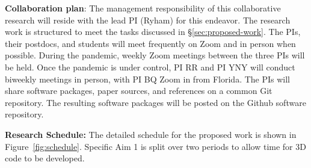 \medskip

\textbf{Collaboration plan}: 
%
The management responsibility of this collaborative research will reside
with the lead PI (Ryham) for this endeavor. The research work is
structured to meet the tasks discussed in \S\ref{sec:proposed-work}.
%
The PIs, their postdocs, and students will meet frequently on Zoom and
in person when possible.  During the pandemic, weekly Zoom meetings between the three PIs will be held.
Once the pandemic is under control, PI RR and PI YNY will conduct biweekly meetings in person, with PI BQ Zoom in from Florida.
The PIs will share software packages, paper
sources, and references on a common \textsf{Git} repository. The
resulting software packages will be posted on the \textsf{Github}
software repository.

\medskip

\textbf{Research Schedule:} The detailed schedule for the proposed work
is shown in Figure~\ref{fig:schedule}. Specific Aim 1 is split over two
periods to allow time for 3D code to be developed.


